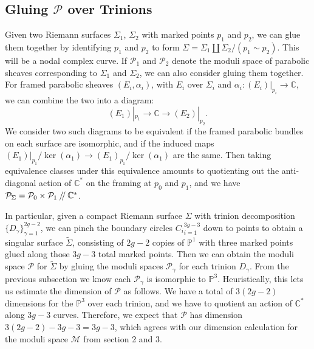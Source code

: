 \documentclass[]{article}
\newcommand{\C}{\mathbb{C}}
\newcommand{\MM}{\mathcal{M}}
\newcommand{\cP}{\mathcal{P}}
\newcommand{\PP}{\mathbb{P}}
\newcommand{\sslash}{\mathbin{/\mkern-4mu/}}
\begin{document}
	\subsection{Gluing $\cP$ over Trinions }
	Given two Riemann surfaces $\Sigma_1$, $\Sigma_2$ with marked points $p_1$ and $p_2$, we can glue them together by identifying $p_1$ and $p_2$ to form $\Sigma = \Sigma_1 \coprod \Sigma_2 / (p_1 \sim p_2)$. This will be a nodal complex curve. If $\cP_1$ and $\cP_2$ denote the moduli space of parabolic sheaves corresponding to $\Sigma_1$ and $\Sigma_2$, we can also consider gluing them together. For framed parabolic sheaves $(E_i,\alpha_i)$, with $E_i$ over $\Sigma_i$ and $\alpha_i:(E_i)|_{p_i}\to \C$, we can combine the two into a diagram:
	\begin{equation}
		(E_1)|_{p_1} \to \C \rightarrow (E_2)|_{p_2}.
	\end{equation}
	We consider two such diagrams to be equivalent if the framed parabolic bundles on each surface are isomorphic, and if the induced maps $(E_1)|_{p_1}/\ker(\alpha_1) \to (E_1)_{p_1}/\ker(\alpha_1)$ are the same. Then taking equivalence classes under this equivalence amounts to quotienting out the anti-diagonal action of $\C^\ast$ on the framing at $p_0$ and $p_1$, and we have $\cP_{\Sigma} = \cP_0 \times \cP_1 \sslash \C^\ast$. 
	
	In particular, given a compact Riemann surface $\Sigma$ with trinion decomposition $\{D_\gamma\}_{\gamma=1}^{2g-2}$, we can pinch the boundary circles ${C_i}_{i=1}^{3g-3}$ down to points to obtain a singular surface $\tilde{\Sigma}$, consisting of $2g-2$ copies of $\PP^1$ with three marked points glued along those $3g-3$ total marked points. Then we can obtain the moduli space $\cP$ for $\tilde{\Sigma}$ by gluing the moduli spaces $\cP_\gamma$ for each trinion $D_\gamma$. From the previous subsection we know each $\cP_\gamma$ is isomorphic to $\PP^3$. Heuristically, this lets us estimate the dimension of $\cP$ as follows. We have a total of $3(2g-2)$ dimensions for the $\PP^3$ over each trinion, and we have to quotient an action of $\C^\ast$ along $3g-3$ curves. Therefore, we expect that $\cP$ has dimension $3(2g-2)-3g-3 = 3g-3$, which agrees with our dimension calculation for the moduli space $\MM$ from section 2 and 3. \vspace{1em}
	
\end{document}
